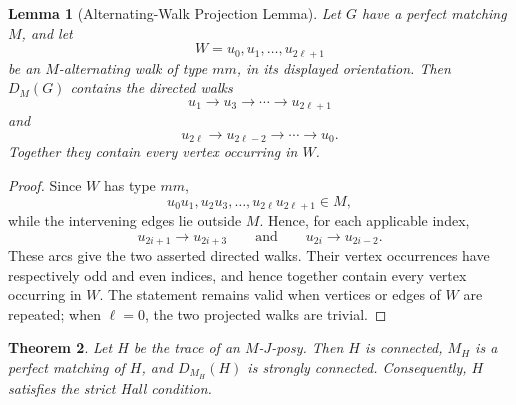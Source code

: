 \documentclass[preprint,12pt]{elsarticle}
\theoremstyle{plain}
\newtheorem{theorem}{Theorem}[section]
\newtheorem{lemma}[theorem]{Lemma}
\begin{document}
\begin{lemma}[Alternating-Walk Projection Lemma]
\label{lem_walk_projection}
Let \(G\) have a perfect matching \(M\), and let
\[
W=u_0,u_1,\ldots,u_{2\ell+1}
\]
be an \(M\)-alternating walk of type \(mm\), in its displayed
orientation. Then \(D_M(G)\) contains the directed walks
\[
u_1\to u_3\to\cdots\to u_{2\ell+1}
\]
and
\[
u_{2\ell}\to u_{2\ell-2}\to\cdots\to u_0.
\]
Together they contain every vertex occurring in \(W\).
\end{lemma}

\begin{proof}
Since \(W\) has type \(mm\),
\[
u_0u_1,u_2u_3,\ldots,u_{2\ell}u_{2\ell+1}\in M,
\]
while the intervening edges lie outside \(M\). Hence, for each applicable
index,
\[
u_{2i+1}\to u_{2i+3}
\qquad\text{and}\qquad
u_{2i}\to u_{2i-2}.
\]
These arcs give the two asserted directed walks. Their vertex occurrences
have respectively odd and even indices, and hence together contain every
vertex occurring in \(W\). The statement remains valid when vertices or
edges of \(W\) are repeated; when \(\ell=0\), the two projected walks are
trivial.
\end{proof}

\begin{theorem}\label{thm_jposy_trace_strict_hall}
Let \(H\) be the trace of an \(M\)-\(J\)-posy. Then \(H\) is connected,
\(M_H\) is a perfect matching of \(H\), and
\(D_{M_H}(H)\) is strongly connected. Consequently, \(H\) satisfies the
strict Hall condition.
\end{theorem}
\end{document}
